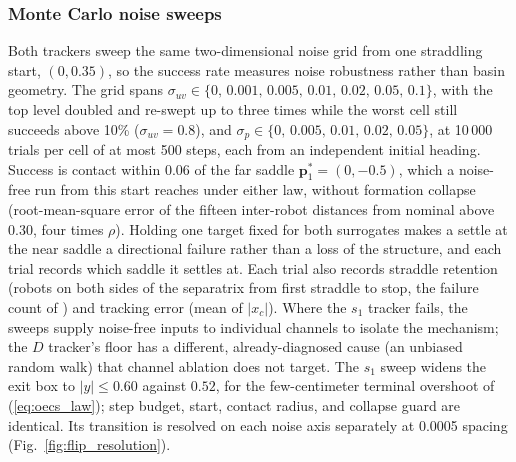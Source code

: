 \documentclass[lettersize,journal]{IEEEtran}
\begin{document}
\subsubsection{Monte Carlo noise sweeps}
Both trackers sweep the same two-dimensional noise grid from one
straddling start, $(0, 0.35)$, so the success rate measures noise
robustness rather than basin geometry. The grid spans $\sigma_{uv} \in
\{0,\, 0.001,\, 0.005,\, 0.01,\, 0.02,\, 0.05,\, 0.1\}$, with the top
level doubled and re-swept up to three times while the worst cell still
succeeds above 10\% ($\sigma_{uv} = 0.8$), and $\sigma_p \in \{0,\,
0.005,\, 0.01,\, 0.02,\, 0.05\}$, at 10\,000 trials per cell of at most
500 steps, each from an independent initial heading. Success is contact
within 0.06 of the far saddle $\mathbf{p}^*_1 = (0, -0.5)$, which a
noise-free run from this start reaches under either law, without
formation collapse (root-mean-square error of the fifteen inter-robot
distances from nominal above 0.30, four times $\rho$). Holding one
target fixed for both surrogates makes a settle at the near saddle a
directional failure rather than a loss of the structure, and each trial
records which saddle it settles at. Each trial also records straddle
retention (robots on both sides of the separatrix from first
straddle to stop, the failure count of \cite{17}) and tracking error (mean of
$|x_c|$). Where the $s_1$ tracker fails, the sweeps supply noise-free inputs to individual channels to isolate the mechanism; the $D$ tracker's floor has a different, already-diagnosed cause (an unbiased random walk) that channel ablation does not target. The $s_1$ sweep widens the exit box to
$|y| \leq 0.60$ against $0.52$, for the few-centimeter terminal
overshoot of (\ref{eq:oecs_law}); step budget, start, contact radius,
and collapse guard are identical. Its transition is resolved on each
noise axis separately at 0.0005 spacing
(Fig.~\ref{fig:flip_resolution}).
\end{document}
